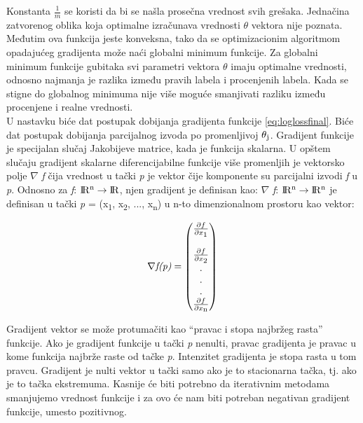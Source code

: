 \documentclass[a4paper,12pt]{report}
\begin{document}
Konstanta $\frac{1}{m}$ se koristi da bi se našla prosečna vrednost svih grešaka. Jednačina zatvorenog oblika koja optimalne izračunava vrednosti $\theta$ vektora nije poznata. Međutim ova funkcija jeste konveksna, tako da se optimizacionim algoritmom opadajućeg gradijenta može naći globalni minimum funkcije. Za globalni minimum funkcije gubitaka svi parametri vektora $\theta$ imaju optimalne vrednosti, odnosno najmanja je razlika između pravih labela i procenjenih labela. Kada se stigne do globalnog minimuma nije više moguće smanjivati razliku između procenjene i realne vrednosti. \\

U nastavku biće dat postupak dobijanja gradijenta funkcije \ref{eq:loglossfinal}. Biće dat postupak dobijanja parcijalnog izvoda po promenljivoj $\theta \textsubscript{j}$. Gradijent funkcije je specijalan slučaj Jakobijeve matrice, kada je funkcija skalarna. U opštem slučaju gradijent skalarne diferencijabilne funkcije više promenljih je vektorsko polje $ \nabla $ \textit{f} čija vrednost u tački \textit{p} je vektor čije komponente su parcijalni izvodi \textit{f} u \textit{p}. Odnosno za \textit{f}: $ \rm I\!R  ^ n \to \rm I\!R $, njen gradijent je definisan kao: $ \nabla $ \textit{f}: $ \rm I\!R  ^ n \to \rm I\!R ^ n $   je definisan u tački \textit{p} = (x\textsubscript{1}, x\textsubscript{2}, ..., x\textsubscript{n}) u n-to dimenzionalnom prostoru kao vektor:

\begin{equation}
\begin{split}
\nabla \textit{f(p)} = 
\begin{pmatrix} \frac{\partial f}{\partial x \textsubscript{1}} \\\\ \frac{\partial f}{\partial x\textsubscript{2}} \\.\\ .\\.\\ \frac{\partial f}{\partial x\textsubscript{n}} \end{pmatrix}
\end{split}
\end{equation}

Gradijent vektor se može protumačiti kao \enquote{pravac i stopa najbržeg rasta} funkcije. Ako je gradijent funkcije u tački \textit{p} nenulti, pravac gradijenta je pravac u kome funkcija najbrže raste od tačke \textit{p}. Intenzitet gradijenta je stopa rasta u tom pravcu. Gradijent je nulti vektor u tački samo ako je to stacionarna tačka, tj. ako je to tačka ekstremuma. Kasnije će biti potrebno da iterativnim metodama smanjujemo vrednost funkcije i za ovo će nam biti potreban negativan gradijent funkcije, umesto pozitivnog.\\
\end{document}
